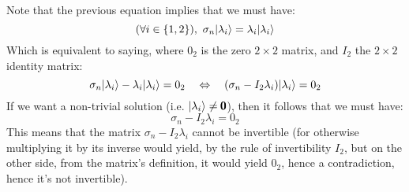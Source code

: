 \documentclass[solutions.tex]{subfiles}
\begin{document}
Note that the previous equation implies that we must have:
\[
	(\forall i \in \{1,2\}),\ \sigma_n|\lambda_i\rangle = \lambda_i|\lambda_i\rangle
\]
Which is equivalent to saying, where $0_2$ is the zero $2\times 2$ matrix,
and $I_2$ the $2\times2$ identity matrix:
\[
	 \sigma_n|\lambda_i\rangle - \lambda_i|\lambda_i\rangle = 0_2
	 \quad\Leftrightarrow\quad
	 	(\sigma_n - I_2\lambda_i)|\lambda_i\rangle = 0_2
\]
If we want a non-trivial solution (i.e. $|\lambda_i\rangle \neq \pmb{0}$), then
it follows that we must have:
\[
	\sigma_n - I_2\lambda_i = 0_2
\]
This means that the matrix $\sigma_n - I_2\lambda_i$ cannot be invertible
(for otherwise multiplying it by its inverse would yield, by the rule
of invertibility $I_2$, but  on the other side, from the matrix's definition,
it would yield $0_2$, hence a contradiction, hence it's not invertible). \\
\end{document}
